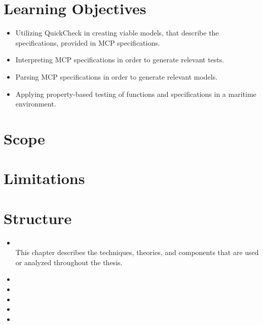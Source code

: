 \section{Learning Objectives}

\begin{itemize}
	\item Utilizing QuickCheck in creating viable models, that describe the specifications, provided in MCP specifications.
	\item Interpreting MCP specifications in order to generate relevant tests.
	\item Parsing MCP specifications in order to generate relevant models.
	\item Applying property-based testing of functions and specifications in a maritime environment.
\end{itemize}

\section{Scope}

\section{Limitations}

\section{Structure}

\begin{itemize}
	\item {}\\
	This chapter describes the techniques, theories, and components that are used or analyzed throughout the thesis.
	\item {}%
	\item {}%
	\item {}%
	\item {}%
	\item {}%
\end{itemize}